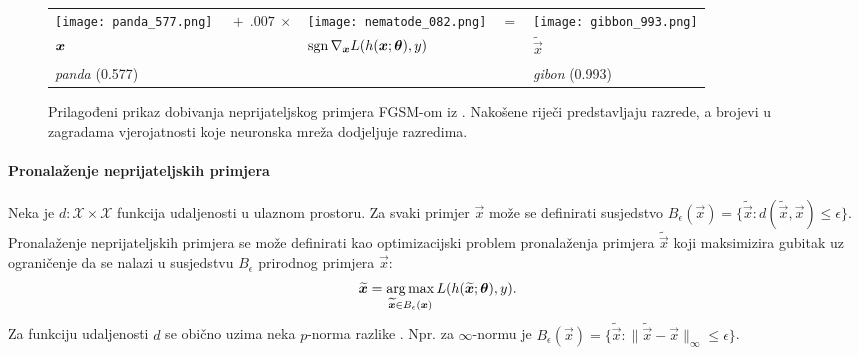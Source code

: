 \documentclass[utf8, seminar, numeric, lmodern]{feri}
\begin{document}
\begin{figure}[htbp]
	\centering
	\begin{tabular}{>{\centering\arraybackslash}m{}m{.5in}>{\centering\arraybackslash}m{}m{.1in}>{\centering\arraybackslash}m{}}
		\centering\arraybackslash
		\texttt{[image: panda\_577.png]} &%
		\centering\arraybackslash%
		$\ +\ .007\ \times$ &%
		\texttt{[image: nematode\_082.png]} &%
		$=$ & %
		\texttt{[image: gibbon\_993.png]} \\
		$\centering \vec x$     &%
		& $\operatorname{sgn} \nabla_{\bm{x}} L(h(\bm{x};\bm{\theta}), y)$ & & $\widetilde{\vec x}$ \\
		\emph{panda} (0.577) & & & & \emph{gibon} (0.993) 
	\end{tabular}
	\caption{Prilagođeni prikaz dobivanja neprijateljskog primjera FGSM-om iz \cite{goodfellow14-ehae}. Nakošene riječi predstavljaju razrede, a brojevi u zagradama vjerojatnosti koje neuronska mreža dodjeljuje razredima.}
	\label{panda}
\end{figure}

\paragraph{Pronalaženje neprijateljskih primjera} Neka je $d:\mathcal{X}\times\mathcal{X}$ funkcija udaljenosti u ulaznom prostoru. Za svaki primjer $\vec x$ može se definirati susjedstvo $B_\epsilon(\vec x) = \{\widetilde{\vec x} : d(\widetilde{\vec x},\vec x)\leq\epsilon\}$. Pronalaženje neprijateljskih primjera se može definirati kao optimizacijski problem \cite{szegedy13-intrig-ipnn, cisse17-pn, madry17-tdlmraa} pronalaženja primjera $\widetilde{\vec x}$ koji maksimizira gubitak uz ograničenje da se nalazi u susjedstvu $B_\epsilon$ prirodnog primjera $\vec x$:
\begin{equation}
\widetilde{\bm{x}} = \operatorname*{arg\,max}_{\widetilde{\bm{x}}\in B_\epsilon(\bm{x})} L(h(\widetilde{\bm{x}};\bm{\theta}), y).
\end{equation}
Za funkciju udaljenosti $d$ se obično uzima neka $p$-norma razlike \cite{goodfellow14-ehae, cisse17-pn, madry17-tdlmraa}. Npr. za $\infty$-normu je $B_\epsilon(\vec x) = \{\widetilde{\vec x} : \lVert \widetilde{\vec x}-\vec x\rVert_\infty\leq\epsilon\}$.
\end{document}
